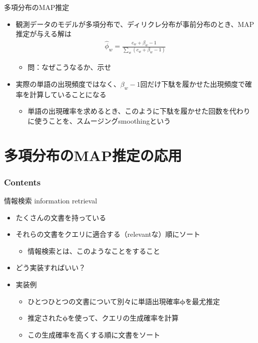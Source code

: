 \documentclass[aspectratio=169,unicode,dvipdfmx,14pt]{beamer}
\begin{document}
\begin{frame}{多項分布のMAP推定}
\begin{itemize}
\item 観測データのモデルが多項分布で、ディリクレ分布が事前分布のとき、MAP推定が与える解は
\begin{align}
\hat{\phi}_w = \frac{c_w + \beta_w - 1}{\sum_w (c_w + \beta_w - 1)} 
\end{align}
\begin{itemize}
\item 問：なぜこうなるか、示せ
\end{itemize}
\item 実際の単語の出現頻度ではなく、$\beta_w - 1$回だけ下駄を履かせた出現頻度で確率を計算していることになる
\begin{itemize}
\item 単語の出現確率を求めるとき、このように下駄を履かせた回数を代わりに使うことを、スムージングsmoothingという
\end{itemize}
\end{itemize}
\end{frame}


\section{多項分布のMAP推定の応用}

\begin{frame}\frametitle{Contents}
\Large \tableofcontents[currentsection]
\end{frame}

\begin{frame}{情報検索 information retrieval}
\begin{itemize}
\item たくさんの文書を持っている
\item それらの文書をクエリに適合する（relevantな）順にソート
\begin{itemize}
\item 情報検索とは、このようなことをすること
\end{itemize}
\item どう実装すればいい？
\item 実装例
\begin{itemize}
\item ひとつひとつの文書について別々に単語出現確率$\bm{\phi}$を最尤推定
\item 推定された$\bm{\phi}$を使って、クエリの生成確率を計算
\item この生成確率を高くする順に文書をソート
\end{itemize}
\end{itemize}
\end{frame}
\end{document}
